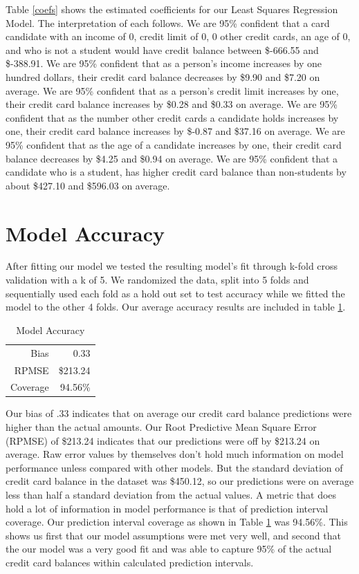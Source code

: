 \documentclass{article}
\begin{document}
Table \ref{coefs} shows the estimated coefficients for our Least Squares Regression Model. The interpretation of each follows. We are 95\% confident that a card candidate with an income of 0, credit limit of 0, 0 other credit cards, an age of 0, and who is not a student would have credit balance between \$-666.55 and \$-388.91. We are 95\% confident that as a person's income increases by one hundred dollars, their credit card balance decreases by \$9.90 and \$7.20 on average.  We are 95\% confident that as a person's credit limit increases by one, their credit card balance increases by \$0.28 and \$0.33 on average.  We are 95\% confident that as the number other credit cards a candidate holds increases by one, their credit card balance increases by \$-0.87 and \$37.16 on average. We are 95\% confident that as the age of a candidate increases by one, their credit card balance decreases by \$4.25 and \$0.94 on average. We are 95\% confident that a candidate who is a student, has higher credit card balance than non-students by about \$427.10 and \$596.03 on average.

\section{Model Accuracy}
After fitting our model we tested the resulting model's fit through k-fold cross validation with a k of 5. We randomized the data, split into 5 folds and sequentially used each fold as a hold out set to test accuracy while we fitted the model to the other 4 folds. Our average accuracy results are included in table \ref{acc}.

\vspace{10 pt}
\begin{table}[ht]
\centering
\begin{tabular}{rr}
  \hline
  Bias &  0.33 \\ 
  RPMSE & \$213.24 \\ 
  Coverage & 94.56\% \\ 
   \hline
\end{tabular}
\caption{Model Accuracy} 
\label{acc}
\end{table}
\vspace{7 pt}

Our bias of .33 indicates that on average our credit card balance predictions were higher than the actual amounts. Our Root Predictive Mean Square Error (RPMSE) of \$213.24 indicates that our predictions were off by \$213.24 on average. Raw error values by themselves don't hold much information on model performance unless compared with other models. But the standard deviation of credit card balance in the dataset was \$450.12, so our predictions were on average less than half a standard deviation from the actual values. A metric that does hold a lot of information in model performance is that of prediction interval coverage. Our prediction interval coverage as shown in Table \ref{acc} was 94.56\%. This shows us first that our model assumptions were met very well, and second that the our model was a very good fit and was able to capture 95\% of the actual credit card balances within calculated prediction intervals.
\end{document}
